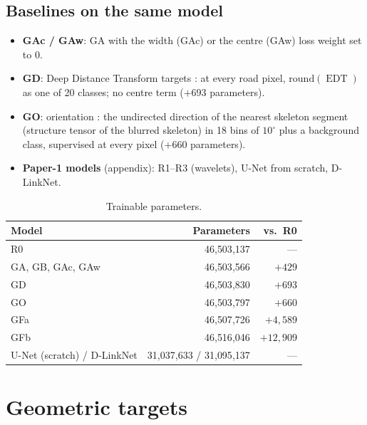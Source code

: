 \documentclass[11pt]{article}
\newcommand{\EDT}{\operatorname{EDT}}
\begin{document}
\subsection{Baselines on the same model}
\begin{itemize}
  \item \textbf{GAc / GAw}: GA with the width (GAc) or the centre (GAw) loss weight set to 0.
  \item \textbf{GD}: Deep Distance Transform targets \cite{wang2020ddt}: at every road pixel,
        $\mathrm{round}(\EDT)$ as one of 20 classes; no centre term ($+693$ parameters).
  \item \textbf{GO}: orientation \cite{batra2019}: the undirected direction of the nearest
        skeleton segment (structure tensor of the blurred skeleton) in 18 bins of $10^\circ$ plus a
        background class, supervised at every pixel ($+660$ parameters).
  \item \textbf{Paper-1 models} (appendix): R1--R3 (wavelets), U-Net from scratch, D-LinkNet.
\end{itemize}

\begin{table}[H]
\centering
\caption{Trainable parameters.}
\small
\begin{tabular}{@{}lrr@{}}
\toprule
Model & Parameters & vs.\ R0 \\
\midrule
R0 & 46{,}503{,}137 & --- \\
GA, GB, GAc, GAw & 46{,}503{,}566 & $+429$ \\
GD & 46{,}503{,}830 & $+693$ \\
GO & 46{,}503{,}797 & $+660$ \\
GFa & 46{,}507{,}726 & $+4{,}589$ \\
GFb & 46{,}516{,}046 & $+12{,}909$ \\
U-Net (scratch) / D-LinkNet & 31{,}037{,}633 / 31{,}095{,}137 & --- \\
\bottomrule
\end{tabular}
\end{table}

\section{Geometric targets}
\label{sec:targets}
\end{document}
